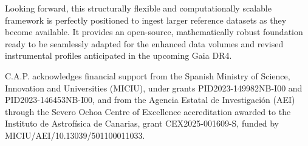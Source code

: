 \documentclass{aa}
\begin{document}
Looking forward, this structurally flexible and computationally scalable framework is perfectly positioned to ingest larger reference datasets as they become available. It provides an open-source, mathematically robust foundation ready to be seamlessly adapted for the enhanced data volumes and revised instrumental profiles anticipated in the upcoming Gaia DR4.


\begin{acknowledgements}
   C.A.P. acknowledges financial support from the Spanish Ministry of Science, Innovation and Universities (MICIU), under grants PID2023-149982NB-I00 and PID2023-146453NB-I00, and from the Agencia Estatal de Investigación (AEI) through the Severo Ochoa Centre of Excellence accreditation awarded to the Instituto de Astrofísica de Canarias, grant CEX2025-001609-S, funded by MICIU/AEI/10.13039/501100011033.
\end{acknowledgements}
\end{document}
